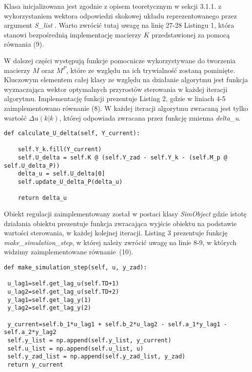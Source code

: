 Klasa inicjalizowana jest zgodnie z opisem teoretycznym w sekcji 3.1.1. z wykorzystaniem wektora odpowiedzi skokowej układu reprezentowanego przez argument \emph{ S{\_}list }. Warto zwrócić tutaj uwagę na linię 27-28 Listingu 1, która stanowi bezpośrednią implementację macierzy \(K\) przedstawionej za pomocą równania (9).
\par W dalszej części występują funkcje pomocnicze wykorzystywane do tworzenia macierzy \(M\) oraz \(M^P\), które ze względu na ich trywialność zostaną pominięte. Kluczowym elementem całej klasy ze względu na działanie algorytmu jest funkcja wyznaczająca wektor optymalnych przyrostów sterowania w każdej iteracji algorytmu. Implementację funkcji prezentuje Listing 2, gdzie w liniach 4-5 zaimplementowano równanie (8). W każdej iteracji algorytmu zwracaną jest tylko wartość \(\Delta u(k|k) \), której odpowiada zwracana przez funkcję zmienna \emph{delta{\_}u}.

\begin{listing}[!htb]
\begin{verbatim}
def calculate_U_delta(self, Y_current): 

	self.Y_k.fill(Y_current)
	self.U_delta = self.K @ (self.Y_zad - self.Y_k - (self.M_p @ self.U_delta_P))
	delta_u = self.U_delta[0]
	self.update_U_delta_P(delta_u)

	return delta_u
\end{verbatim}
\end{listing}

\par Obiekt regulacji zaimplementowany został w postaci klasy \emph{SimObject} gdzie istotę działania obiektu prezentuje funkcja zwracająca wyjście obiektu na podstawie wartości sterowania, w każdej kolejnej iteracji. Listing 3 prezentuje funkcję \emph{make{\_}simulation{\_}step}, w której należy zwrócić uwagę na linie 8-9, w których widzimy zaimplementowane równanie~(10).

\begin{listing}[!htb]
\begin{verbatim}
def make_simulation_step(self, u, y_zad):
		
 u_lag1=self.get_lag_u(self.TD+1)
 u_lag2=self.get_lag_u(self.TD+2)
 y_lag1=self.get_lag_y(1)
 y_lag2=self.get_lag_y(2)

 y_current=self.b_1*u_lag1 + self.b_2*u_lag2 - self.a_1*y_lag1 - self.a_2*y_lag2
 self.y_list = np.append(self.y_list, y_current)
 self.u_list = np.append(self.u_list, u)
 self.y_zad_list = np.append(self.y_zad_list, y_zad)
 return y_current
\end{verbatim}
\end{listing}
 

